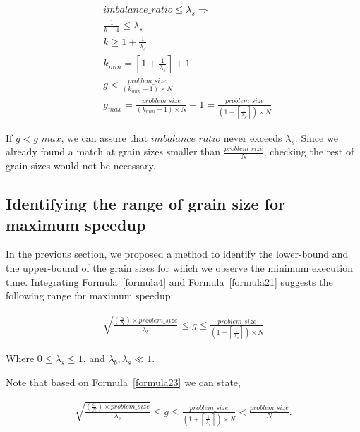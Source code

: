 \begin{equation}\label{formula21}
\begin{aligned}
&imbalance\_{ratio}\leq{{\lambda_s}}\Rightarrow\\
&\frac{1}{k-1}\leq\lambda_s\\
&k\geq{1+\frac{1}{\lambda_s}}\\
&k_{min}=\left\lceil{1+\frac{1}{\lambda_s}}\right\rceil+1\\
&{g}<\frac{problem\_{size}}{(k_{min}-1)\times{N}}\\
&g_{max}=\frac{problem\_{size}}{(k_{min}-1)\times{N}}-1=\frac{problem\_{size}}{(1+\left\lceil{\frac{1}{\lambda_s}}\right\rceil)\times{N}}
\end{aligned}
\end{equation}

If $g<g\_{max}$, we can assure that $imbalance\_{ratio}$ never exceeds $\lambda_s$. Since we already found a match at grain sizes smaller than $\frac{problem\_{size}}{N}$, checking the rest of grain sizes would not be necessary.







\vspace{\baselineskip}
\subsection{Identifying the range of grain size for maximum speedup}
In the previous section, we proposed a method to identify the lower-bound and the upper-bound of the grain sizes for which we observe the minimum execution time. 
Integrating Formula~\ref{formula4} and Formula~\ref{formula21} suggests the following range for maximum speedup:


\begin{equation}\label{formula23}
\begin{aligned}
{\sqrt{\frac{(\frac{\alpha}{N})\times{problem\_{size}}}{{\lambda_b}}}}\leq{g}\leq\frac{problem\_{size}}{(1+\left\lceil{\frac{1}{\lambda_s}}\right\rceil)\times{N}}
\end{aligned}
\end{equation}
 
Where $0\leq\lambda_s\leq1$, and $\lambda_b,\lambda_s\ll1$.

Note that based on Formula~\ref{formula23} we can state,

\begin{equation}\label{formula43}
\begin{aligned}
{\sqrt{\frac{(\frac{\alpha}{N})\times{problem\_{size}}}{{\lambda_b}}}}\leq{g}\leq\frac{problem\_{size}}{(1+\left\lceil{\frac{1}{\lambda_s}}\right\rceil)\times{N}}<\frac{problem\_{size}}{N}.
\end{aligned}
\end{equation}

